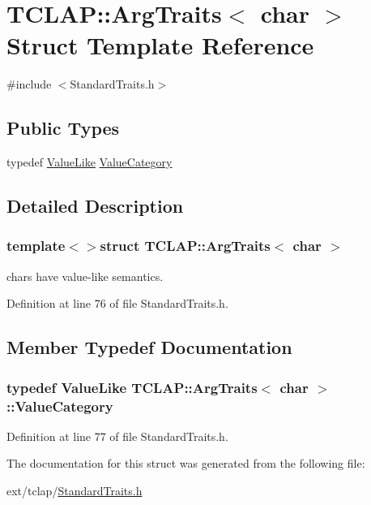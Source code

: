 \hypertarget{struct_t_c_l_a_p_1_1_arg_traits_3_01char_01_4}{}\section{T\+C\+L\+A\+P\+:\+:Arg\+Traits$<$ char $>$ Struct Template Reference}
\label{struct_t_c_l_a_p_1_1_arg_traits_3_01char_01_4}


{\ttfamily \#include $<$Standard\+Traits.\+h$>$}

\subsection*{Public Types}
\begin{DoxyCompactItemize}
\item 
typedef \hyperlink{struct_t_c_l_a_p_1_1_value_like}{Value\+Like} \hyperlink{struct_t_c_l_a_p_1_1_arg_traits_3_01char_01_4_a36f7fe1b3b1649ef8ec08ef7d6fc3160}{Value\+Category}
\end{DoxyCompactItemize}


\subsection{Detailed Description}
\subsubsection*{template$<$$>$struct T\+C\+L\+A\+P\+::\+Arg\+Traits$<$ char $>$}

chars have value-\/like semantics. 

Definition at line 76 of file Standard\+Traits.\+h.



\subsection{Member Typedef Documentation}
\hypertarget{struct_t_c_l_a_p_1_1_arg_traits_3_01char_01_4_a36f7fe1b3b1649ef8ec08ef7d6fc3160}{}
\subsubsection[{Value\+Category}]{\setlength{\rightskip}{0pt plus 5cm}typedef {\bf Value\+Like} {\bf T\+C\+L\+A\+P\+::\+Arg\+Traits}$<$ char $>$\+::{\bf Value\+Category}}\label{struct_t_c_l_a_p_1_1_arg_traits_3_01char_01_4_a36f7fe1b3b1649ef8ec08ef7d6fc3160}


Definition at line 77 of file Standard\+Traits.\+h.



The documentation for this struct was generated from the following file\+:\begin{DoxyCompactItemize}
\item 
ext/tclap/\hyperlink{_standard_traits_8h}{Standard\+Traits.\+h}\end{DoxyCompactItemize}
